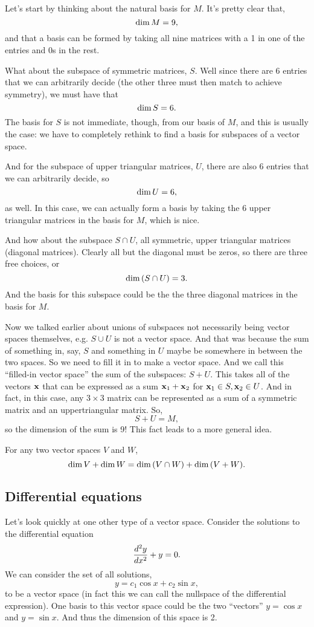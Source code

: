 Let's start by thinking about the natural basis for $M$. It's pretty clear that,
\[ \mathrm{dim}\, M = 9, \]
and that a basis can be formed by taking all nine matrices with a 1 in one of the entries and 0s in the rest. 

What about the subspace of symmetric matrices, $S$. Well since there are 6 entries that we can arbitrarily decide (the other three must then match to achieve symmetry), we must have that
\[ \mathrm{dim}\, S = 6. \]
The basis for $S$ is not immediate, though, from our basis of $M$, and this is usually the case: we have to completely rethink to find a basis for subspaces of a vector space.

And for the subspace of upper triangular matrices, $U$, there are also 6 entries that we can arbitrarily decide, so
\[ \mathrm{dim}\, U = 6, \]
as well. In this case, we can actually form a basis by taking the 6 upper triangular matrices in the basis for $M$, which is nice.

And how about the subspace $S \cap U$, all symmetric, upper triangular matrices (diagonal matrices). Clearly all but the diagonal must be zeros, so there are three free choices, or
\[ \mathrm{dim}\, (S \cap U) = 3. \]
And the basis for this subspace could be the the three diagonal matrices in the basis for $M$. 

Now we talked earlier about unions of subspaces not necessarily being vector spaces themselves, e.g. $S \cup U$ is not a vector space. And that was because the sum of something in, say, $S$ and something in $U$ maybe be somewhere in between the two spaces. So we need to fill it in to make a vector space. And we call this ``filled-in vector space'' the sum of the subspaces: 
$S + U$. This takes all of the vectors $\boldsymbol{\mathbf{x}}$ that can be expressed as a sum $\boldsymbol{\mathbf{x}}_1+\boldsymbol{\mathbf{x}}_2$ for $\boldsymbol{\mathbf{x}}_1 \in S, \boldsymbol{\mathbf{x}}_2 \in U$. And in fact, in this case, any $3 \times 3$ matrix can be represented as a sum of a symmetric matrix and an uppertriangular matrix. So,
\[ S+U = M, \]
so the dimension of the sum is 9! This fact leads to a more general idea. 

\btm
For any two vector spaces $V$ and $W$,
\[ \mathrm{dim}\, V + \mathrm{dim}\, W = \mathrm{dim}\, (V \cap W) + \mathrm{dim}\, (V + W). \]
\etm

\subsection{Differential equations}

Let's look quickly at one other type of a vector space. Consider the solutions to the differential equation
\[ \frac{d^{2}y}{dx^{2}} + y = 0. \]
We can consider the set of all solutions,
\[ y = c_1 \cos x + c_2 \sin x, \]
to be a vector space (in fact this we can call the nullspace of the differential expression). One basis to this vector space could be the two ``vectors'' $y = \cos x$ and $y = \sin x$. And thus the dimension of this space is 2. 

